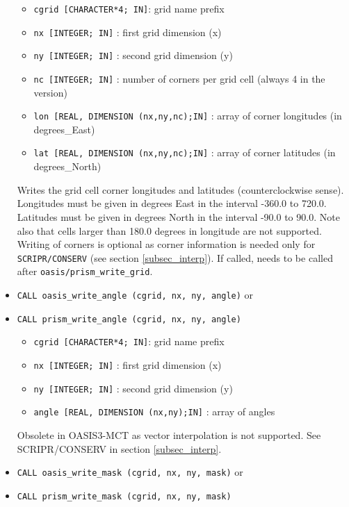 \begin{itemize}
 \begin{itemize}
    \item {\tt cgrid [CHARACTER*4; IN]}: grid name prefix
    \item {\tt nx [INTEGER; IN]} : first grid dimension (x)
    \item {\tt ny [INTEGER; IN]} : second grid dimension (y)
    \item {\tt nc [INTEGER; IN]} : number of corners per grid cell (always 4 in the version)
    \item {\tt lon [REAL, DIMENSION (nx,ny,nc);IN]} : array of corner
    longitudes (in degrees\_East)
    \item {\tt lat [REAL, DIMENSION (nx,ny,nc);IN]} : array of corner
    latitudes (in degrees\_North)
 \end{itemize}

 Writes the grid cell corner longitudes and latitudes
 (counterclockwise sense). Longitudes must be given in degrees East in
 the interval -360.0 to 720.0. Latitudes must be given in degrees
 North in the interval -90.0 to 90.0. Note also that cells larger than
 180.0 degrees in longitude are not supported. Writing of corners is
 optional as corner information is needed only for {\tt
   SCRIPR/CONSERV} (see section \ref{subsec_interp}). If called, needs
 to be called after {\tt oasis/prism\_write\_grid}.

\vspace{0.2cm}
\item {\tt CALL oasis\_write\_angle (cgrid, nx, ny, angle)} or
\item {\tt CALL prism\_write\_angle (cgrid, nx, ny, angle)}

 \begin{itemize}
    \item {\tt cgrid [CHARACTER*4; IN]}: grid name prefix
    \item {\tt nx [INTEGER; IN]} : first grid dimension (x)
    \item {\tt ny [INTEGER; IN]} : second grid dimension (y)
    \item {\tt angle [REAL, DIMENSION (nx,ny);IN]} : array of angles
 \end{itemize}

Obsolete in OASIS3-MCT as vector interpolation is not supported. 
See SCRIPR/CONSERV in section \ref{subsec_interp}.

\vspace{0.2cm}
\item {\tt CALL oasis\_write\_mask (cgrid, nx, ny, mask)} or
\item {\tt CALL prism\_write\_mask (cgrid, nx, ny, mask)}


\end{itemize}

